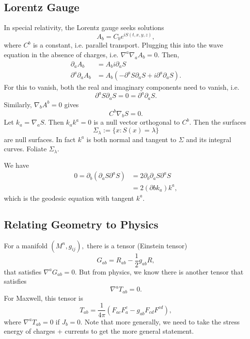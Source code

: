 \documentclass{article}
\numberwithin{equation}{section}
\begin{document}
\subsection{Lorentz Gauge}
In special relativity, the Lorentz gauge seeks solutions 
\begin{equation*}
    A_b = C_b e^{iS(t,x,y,z)},
\end{equation*}
where $C^b$ is a constant, i.e. parallel transport. Plugging this into the wave equation in the absence of charges, i.e. $\nabla^a\nabla_a A_b=0.$ Then,
\begin{align*}
    \partial_a A_b &= A_b i\partial_a S \\ 
    \partial^a\partial_a A_b &= A_b\left(-\partial^a S\partial_a S + i\partial^a\partial_a S\right).
\end{align*}
For this to vanish, both the real and imaginary components need to vanish, i.e. 
\begin{equation*}
    \partial^aS \partial_a S = 0 = \partial^a \partial_a S.
\end{equation*}
Similarly, $\nabla_b A^b=0$ gives
\begin{equation*}
    C^b\nabla_b S = 0.
\end{equation*}
Let $k_a = \nabla_a S.$ Then $k_ak^a=0$ is a null vector orthogonal to $C^b.$ Then the surfaces 
\begin{equation*}
    \Sigma_\lambda := \{x:S(x)=\lambda\}
\end{equation*}
are null surfaces. In fact $k^a$ is both normal and tangent to $\Sigma$ and its integral curves. Foliate $\Sigma_\lambda.$

We have 
\begin{align*}
    0 = \partial_b(\partial_a S\partial^a S) &= 2\partial_b\partial_a S\partial^a S \\ 
    &= 2\left(\partial b k_a\right)k^a,
\end{align*}
which is the geodesic equation with tangent $k^a.$
\subsection{Relating Geometry to Physics}
For a manifold $(M^n,g_{ij}),$ there is a tensor (Einstein tensor)
\begin{equation*}
    G_{ab} = R_{ab} - \frac{1}{2}g_{ab}R,
\end{equation*}
that satisfies $\nabla^a G_{ab} = 0.$ But from physics, we know there is another tensor that satisfies 
\begin{equation*}
    \nabla^a T_{ab} = 0.
\end{equation*}
For Maxwell, this tensor is 
\begin{equation*}
    T_{ab} = \frac{1}{4\pi} \left(F_{ac}F^{c}_{a} - g_{ab} F_{cd}F^{cd}\right),
\end{equation*}
where $\nabla^a T_{ab}=0$ if $J_b=0.$ Note that more generally, we need to take the stress energy of charges + currents to get the more general statement.
\end{document}
